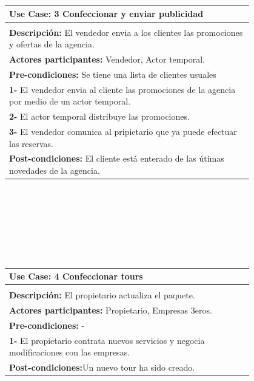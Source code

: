 \documentclass[12pt,a4paper,titlepage,oneside]{article}
\begin{document}
\begin{tabular}{| l | p{0.8\linewidth} |} \hline
	\multicolumn{2}{|p{0.8\linewidth}|}{\textbf{Use Case:} 3 Confeccionar y enviar publicidad} \\ \hline
	\multicolumn{2}{|c|}{} \\ \hline
	\multicolumn{2}{|p{0.8\linewidth}|}{\textbf{Descripci\'on:} El vendedor envia a los clientes las promociones y ofertas de la agencia.} \\ \hline
	\multicolumn{2}{|p{0.8\linewidth}|}{\textbf{Actores participantes:} Vendedor, Actor temporal.} \\ \hline
	\multicolumn{2}{|p{0.8\linewidth}|}{\textbf{Pre-condiciones:} Se tiene una lista de clientes usuales} \\ \hline
	\multicolumn{2}{|p{0.8\linewidth}|}{\textbf{1-} El vendedor envia al cliente las promociones de la agencia por medio de un actor temporal.} \\
	\multicolumn{2}{|p{0.8\linewidth}|}{\textbf{2-} El actor temporal distribuye las promociones.} \\ \hline
	\multicolumn{2}{|p{0.8\linewidth}|}{\textbf{3-} El vendedor comunica al pripietario que ya puede efectuar las reservas.}\\ \hline
	\multicolumn{2}{|p{0.8\linewidth}|}{\textbf{Post-condiciones:} El cliente está enterado de las útimas novedades de la agencia.}\\ \hline
\end{tabular} \\\\
\\\\\\\\


\begin{tabular}{| l | p{0.8\linewidth} |} \hline
	\multicolumn{2}{|p{0.8\linewidth}|}{\textbf{Use Case:} 4 Confeccionar tours} \\ \hline
	\multicolumn{2}{|c|}{} \\ \hline
	\multicolumn{2}{|p{0.8\linewidth}|}{\textbf{Descripci\'on:} El propietario actualiza el paquete.} \\ \hline
	\multicolumn{2}{|p{0.8\linewidth}|}{\textbf{Actores participantes:} Propietario, Empresas 3eros.} \\ \hline
	\multicolumn{2}{|p{0.8\linewidth}|}{\textbf{Pre-condiciones:} -} \\ \hline
	\multicolumn{2}{|p{0.8\linewidth}|}{\textbf{1-} El propietario contrata nuevos servicios y negocia modificaciones con las empresas.} \\ \hline
	\multicolumn{2}{|p{0.8\linewidth}|}{\textbf{Post-condiciones:}Un nuevo tour ha sido creado.}\\ \hline
\end{tabular} \\\\
\\\\\\\\
\end{document}
